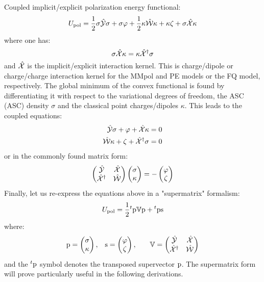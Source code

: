 Coupled implicit/explicit polarization energy functional:
\begin{equation}
  U_\mathrm{pol} =
   \frac{1}{2}\sigma\hat{\mathcal{Y}}\sigma + \sigma\varphi
 + \frac{1}{2}\kappa\hat{\mathcal{W}}\kappa + \kappa\zeta
 + \sigma\hat{\mathcal{X}}\kappa
\end{equation}
where one has:
\begin{equation}
  \sigma\hat{\mathcal{X}}\kappa = \kappa\hat{\mathcal{X}}^\dagger\sigma
\end{equation}
and $\hat{\mathcal{X}}$ is the implicit/explicit interaction kernel. This is
charge/dipole or charge/charge interaction kernel for the MMpol and PE models
or the FQ model, respectively.
The global minimum of the convex functional is found by differentiating
it with respect to the variational degrees of freedom, \ie{} the
\acl{ASC} (\acs{ASC}) density $\sigma$ and the classical point
charges/dipoles $\kappa$. This leads to the coupled equations:
\begin{align}
  \hat{\mathcal{Y}}\sigma + \varphi + \hat{\mathcal{X}}\kappa &= 0 \\
  \hat{\mathcal{W}}\kappa  + \zeta + \hat{\mathcal{X}}^\dagger\sigma &= 0
\end{align}
or in the commonly found matrix form:
\begin{equation}
  \begin{pmatrix}
    \hat{\mathcal{Y}} & \hat{\mathcal{X}} \\
    \hat{\mathcal{X}}^\dagger & \hat{\mathcal{W}}
  \end{pmatrix}
  \begin{pmatrix}
   \sigma \\
   \kappa
  \end{pmatrix}
  =
  -
  \begin{pmatrix}
   \varphi \\
   \zeta
  \end{pmatrix}
\end{equation}
Finally, let us re-express the equations above in a "supermatrix"
formalism:
\begin{equation}
  U_\mathrm{pol} =
  \frac{1}{2}{}^t\mathrm{p}\mathbb{V}\mathrm{p} + {}^t\mathrm{p}\mathrm{s}
\end{equation}
where:
\begin{alignat}{3}
  \mathrm{p} =
  \begin{pmatrix}
    \sigma \\
    \kappa
  \end{pmatrix},
  \quad&
  \mathrm{s} =
  \begin{pmatrix}
   \varphi \\
   \zeta
  \end{pmatrix},
  \quad&
  \mathbb{V} =
  \begin{pmatrix}
    \hat{\mathcal{Y}} & \hat{\mathcal{X}} \\
    \hat{\mathcal{X}}^\dagger & \hat{\mathcal{W}}
  \end{pmatrix}
\end{alignat}
and the ${}^t\mathrm{p}$ symbol denotes the transposed supervector $\mathrm{p}$.
The supermatrix form will prove particularly useful in the following
derivations.
